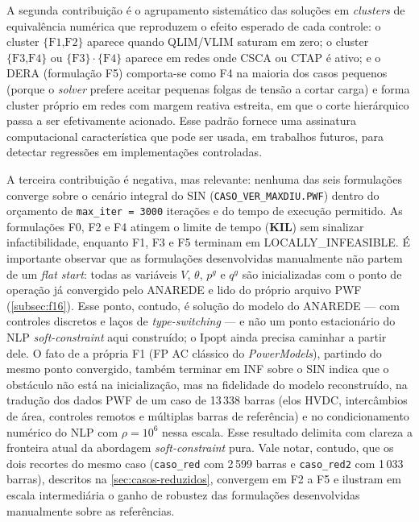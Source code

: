 A segunda contribuição é o agrupamento sistemático das soluções em \textit{clusters} de equivalência numérica que reproduzem o efeito esperado de cada controle: o cluster $\{\text{F1,F2}\}$ aparece quando QLIM/VLIM saturam em zero; o cluster $\{\text{F3,F4}\}$ ou $\{\text{F3}\}\cdot\{\text{F4}\}$ aparece em redes onde CSCA ou CTAP é ativo; e o DERA (formulação F5) comporta-se como F4 na maioria dos casos pequenos (porque o \textit{solver} prefere aceitar pequenas folgas de tensão a cortar carga) e forma cluster próprio em redes com margem reativa estreita, em que o corte hierárquico passa a ser efetivamente acionado. Esse padrão fornece uma assinatura computacional característica que pode ser usada, em trabalhos futuros, para detectar regressões em implementações controladas.

A terceira contribuição é negativa, mas relevante: nenhuma das seis formulações converge sobre o cenário integral do SIN (\texttt{CASO\_VER\_MAXDIU.PWF}) dentro do orçamento de \texttt{max\_iter = 3000} iterações e do tempo de execução permitido. As formulações F0, F2 e F4 atingem o limite de tempo (\textbf{KIL}) sem sinalizar infactibilidade, enquanto F1, F3 e F5 terminam em LOCALLY\_INFEASIBLE. É importante observar que as formulações desenvolvidas manualmente não partem de um \textit{flat start}: todas as variáveis $V$, $\theta$, $p^g$ e $q^g$ são inicializadas com o ponto de operação já convergido pelo ANAREDE e lido do próprio arquivo PWF (\autoref{subsec:f16}). Esse ponto, contudo, é solução do modelo do ANAREDE --- com controles discretos e laços de \textit{type-switching} --- e não um ponto estacionário do NLP \textit{soft-constraint} aqui construído; o Ipopt ainda precisa caminhar a partir dele. O fato de a própria F1 (FP AC clássico do \textit{PowerModels}), partindo do mesmo ponto convergido, também terminar em INF sobre o SIN indica que o obstáculo não está na inicialização, mas na fidelidade do modelo reconstruído, na tradução dos dados PWF de um caso de 13\,338 barras (elos HVDC, intercâmbios de área, controles remotos e múltiplas barras de referência) e no condicionamento numérico do NLP com $\rho = 10^6$ nessa escala. Esse resultado delimita com clareza a fronteira atual da abordagem \textit{soft-constraint} pura. Vale notar, contudo, que os dois recortes do mesmo caso (\texttt{caso\_red} com 2\,599 barras e \texttt{caso\_red2} com 1\,033 barras), descritos na \autoref{sec:casos-reduzidos}, convergem em F2 a F5 e ilustram em escala intermediária o ganho de robustez das formulações desenvolvidas manualmente sobre as referências.

